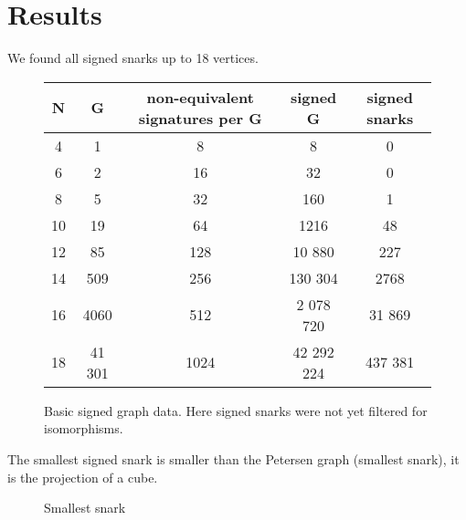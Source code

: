 \chapter{Results}

We found all signed snarks up to 18 vertices.

\begin{figure}[h]
    \centering
    \begin{tabular}{ |c|c|c|c|c| }
        \hline
        N & G & non-equivalent signatures per G & signed G & signed snarks \\
        \hline
        \hline
        4 & 1 & 8 & 8 & 0 \\
        \hline
        6 & 2 & 16 & 32 & 0 \\
        \hline
        8 & 5 & 32 & 160 & 1 \\
        \hline
        10 & 19 & 64 & 1216 & 48 \\
        \hline
        12 & 85 & 128 & 10 880 & 227 \\
        \hline
        14 & 509 & 256 & 130 304 & 2768 \\
        \hline
        16 & 4060 & 512 & 2 078 720 & 31 869 \\
        \hline
        18 & 41 301 & 1024 & 42 292 224 & 437 381 \\
        \hline
    \end{tabular}
    \caption[Basic signed graph data]{Basic signed graph data. Here signed snarks were not yet filtered for isomorphisms.}
\end{figure}

The smallest signed snark is smaller than the Petersen graph (smallest snark), it is the projection of a cube.

\begin{figure}[h]
    \centering
    \caption{Smallest snark}
\end{figure}

